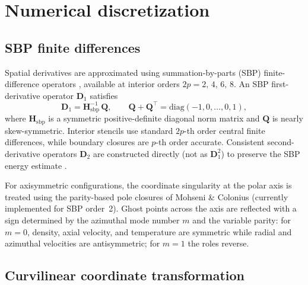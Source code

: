 \documentclass[11pt]{article}
\begin{document}
\section{Numerical discretization}
\label{sec:discretization}

\subsection{SBP finite differences}
\label{sec:sbp}

Spatial derivatives are approximated using summation-by-parts (SBP) finite-difference operators \cite{strand1994summation,mattsson2004summation}, available at interior orders $2p = 2,\,4,\,6,\,8$.
An SBP first-derivative operator $\mathbf{D}_1$ satisfies
\begin{equation}
  \mathbf{D}_1 = \mathbf{H}_{\mathrm{sbp}}^{-1}\,\mathbf{Q},
  \qquad
  \mathbf{Q} + \mathbf{Q}^\top = \mathrm{diag}(-1,0,\ldots,0,1),
  \label{eq:sbp_property}
\end{equation}
where $\mathbf{H}_{\mathrm{sbp}}$ is a symmetric positive-definite diagonal norm matrix and $\mathbf{Q}$ is nearly skew-symmetric.
Interior stencils use standard $2p$-th order central finite differences, while boundary closures are $p$-th order accurate.
Consistent second-derivative operators $\mathbf{D}_2$ are constructed directly (not as $\mathbf{D}_1^2$) to preserve the SBP energy estimate \cite{mattsson2004summation}.

For axisymmetric configurations, the coordinate singularity at the polar axis is treated using the parity-based pole closures of Mohseni \& Colonius \cite{mohseni2000numerical} (currently implemented for SBP order~2).
Ghost points across the axis are reflected with a sign determined by the azimuthal mode number $m$ and the variable parity: for $m=0$, density, axial velocity, and temperature are symmetric while radial and azimuthal velocities are antisymmetric; for $m=1$ the roles reverse.

\subsection{Curvilinear coordinate transformation}
\label{sec:curvilinear}
\end{document}
